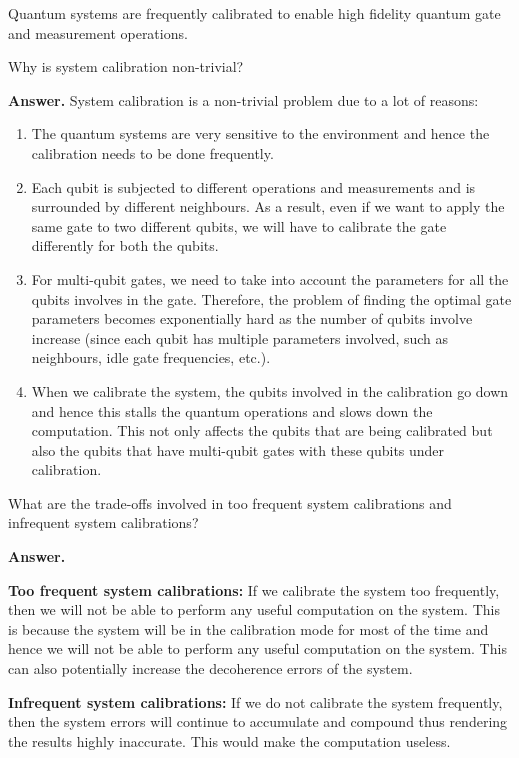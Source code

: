 Quantum systems are frequently calibrated to enable high fidelity quantum gate and measurement operations.

\tcbline{}

\begin{question}
    Why is system calibration non-trivial?
\end{question}
\textbf{Answer.} System calibration is a non-trivial problem due to a lot of reasons:
\begin{enumerate}
    \item The quantum systems are very sensitive to the environment and hence the calibration needs to be done frequently.
    \item Each qubit is subjected to different operations and measurements and is surrounded by different neighbours. As a result, even if we want to apply the same gate to two different qubits, we will have to calibrate the gate differently for both the qubits.
    \item For multi-qubit gates, we need to take into account the parameters for all the qubits involves in the gate. Therefore, the problem of finding the optimal gate parameters becomes exponentially hard as the number of qubits involve increase (since each qubit has multiple parameters involved, such as neighbours, idle gate frequencies, etc.).
    \item When we calibrate the system, the qubits involved in the calibration go down and hence this stalls the quantum operations and slows down the computation. This not only affects the qubits that are being calibrated but also the qubits that have multi-qubit gates with these qubits under calibration.
\end{enumerate}

\tcbline{}

\begin{question}
    What are the trade-offs involved in too frequent system calibrations and infrequent system calibrations?
\end{question}
\textbf{Answer.}

\textbf{Too frequent system calibrations:} If we calibrate the system too frequently, then we will not be able to perform any useful computation on the system. This is because the system will be in the calibration mode for most of the time and hence we will not be able to perform any useful computation on the system. This can also potentially increase the decoherence errors of the system.

\textbf{Infrequent system calibrations:} If we do not calibrate the system frequently, then the system errors will continue to accumulate and compound thus rendering the results highly inaccurate. This would make the computation useless.

